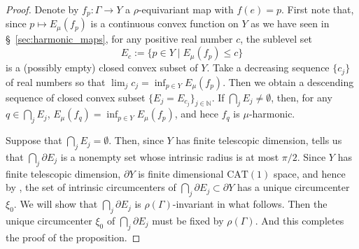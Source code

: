 \documentclass[12pt]{amsart}
\numberwithin{equation}{section}
\theoremstyle{plain}
\theoremstyle{definition}
\theoremstyle{remark}
\newcommand{\N}{{\mathbb N}}
\newcommand{\ene}[1]{E_{#1}}
\newcommand{\cat}[1]{\mathrm{CAT}(#1)}
\begin{document}
\begin{proof}
 Denote by $f_p \colon \Gamma \rightarrow Y$ a $\rho$-equivariant map
 with $f(e)=p$.
 First note that, since $p\mapsto \ene{\mu}(f_p)$ is a continuous convex
 function on $Y$ as we have seen in \S~\ref{sec:harmonic_maps}, for any
 positive real number $c$, the sublevel set 
 \begin{equation*}
  E_c:= \{p \in Y \mid \ene{\mu}(f_p) \leq c\}
 \end{equation*}
 is a (possibly empty) closed convex subset of $Y$. 
 Take a decreasing sequence $\{c_j\}$ of real numbers so that 
 $\lim_j c_j = \inf_{p \in Y} \ene{\mu}(f_p)$. 
 Then we obtain a descending sequence of closed convex subset
 $\{E_j=E_{c_j}\}_{j \in \N}$. 
 If $\bigcap_j E_j\not= \emptyset$, then, for any  
 $q \in \bigcap_j E_j$, 
 $\ene{\mu}(f_q)=\inf_{p \in Y} \ene{\mu}(f_p)$, and hece $f_q$ is
 $\mu$-harmonic. 

 Suppose that $\bigcap_j E_j=\emptyset$. 
 Then, since $Y$ has finite telescopic dimension, 
 \cite[Lemma 5.5]{caprace1} tells us that 
 $\bigcap_j \partial E_j$ is a nonempty set whose intrinsic 
 radius is at most $\pi/2$.  
 Since $Y$ has finite telescopic dimension, $\partial Y$ is finite
 dimensional $\cat{1}$ space, and hence by 
 \cite[Proposition 1.4]{balser-lytchak}, the set of intrinsic
 circumcenters of 
 $\bigcap_j \partial E_j\subset \partial Y$ has a unique
 circumcenter $\xi_0$. 
 We will show that $\bigcap_j \partial E_j$ is $\rho(\Gamma)$-invariant
 in what follows. 
 Then the unique circumcenter $\xi_0$ of 
 $\bigcap_j \partial E_j$ must be fixed by $\rho(\Gamma)$. 
 And this completes the proof of the proposition. 


\end{proof}
\end{document}
